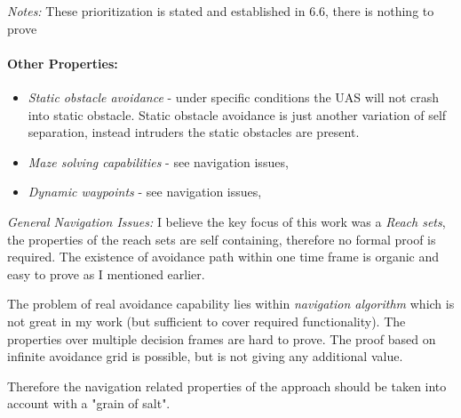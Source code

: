 \documentclass[12pt, a4paper]{report}
\theoremstyle{plain}
\theoremstyle{plain}
\theoremstyle{remark}
\begin{document}
\noindent \emph{Notes:} These prioritization is stated and established in 6.6, there is nothing to prove

\paragraph{Other Properties:}
\begin{itemize}
    \item \emph{Static obstacle avoidance} - under specific conditions the UAS will not crash into static obstacle. Static obstacle avoidance is just another variation of self separation, instead intruders the static obstacles are present. 
    
    \item \emph{Maze solving capabilities} - see navigation issues,
    
    \item \emph{Dynamic waypoints} - see navigation issues,
\end{itemize}

\emph{General Navigation Issues:} I believe the key focus of this work was a \emph{Reach sets}, the properties of the reach sets are self containing, therefore no formal proof is required. The existence of avoidance path within one time frame is organic and easy to prove as I mentioned earlier.

The problem of real avoidance capability lies within \emph{navigation algorithm} which is not great in my work (but sufficient to cover required functionality). The properties over multiple decision frames are hard to prove. The proof based on infinite avoidance grid is possible, but is not giving any additional value.

Therefore the navigation related properties of the approach should be taken into account with a "grain of salt".
%
\end{document}
